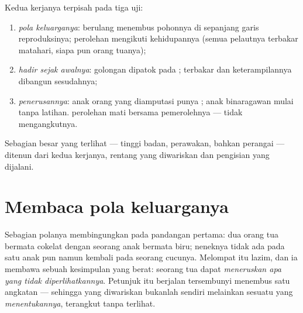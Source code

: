 \begin{proposition}\label{prop:g9:heredity-and-traits:sorting}
Kedua kerjanya terpisah pada tiga uji:
\begin{enumerate}
  \item \emph{pola keluarganya}:  berulang
        menembus pohonnya di sepanjang garis reproduksinya;
         perolehan mengikuti kehidupannya (semua
        pelautnya terbakar matahari, siapa pun orang tuanya);
  \item \emph{hadir sejak awalnya}: golongan 
        dipatok pada ;  terbakar dan
        keterampilannya dibangun sesudahnya;
  \item \emph{penerusannya}: anak orang yang diamputasi
        punya ; anak binaragawan mulai tanpa
        latihan.  perolehan mati bersama pemerolehnya
        ---  tidak mengangkutnya.
\end{enumerate}
Sebagian besar  yang terlihat --- tinggi badan,
perawakan, bahkan perangai --- ditenun dari kedua kerjanya,
rentang yang diwariskan dan pengisian yang dijalani.
\end{proposition}
\admitted

\section{Membaca pola keluarganya}

\begin{example}\label{ex:g9:heredity-and-traits:skip}
Sebagian polanya membingungkan pada pandangan pertama: dua
orang tua bermata cokelat dengan seorang anak bermata biru;
 neneknya tidak ada pada satu anak pun namun kembali
pada seorang cucunya. Melompat itu lazim, dan ia membawa
sebuah kesimpulan yang berat: seorang tua dapat
\emph{meneruskan apa yang tidak diperlihatkannya}. Petunjuk
 itu berjalan tersembunyi menembus satu angkatan ---
sehingga yang diwariskan bukanlah  sendiri melainkan
sesuatu yang \emph{menentukannya}, terangkut tanpa terlihat.
\end{example}

